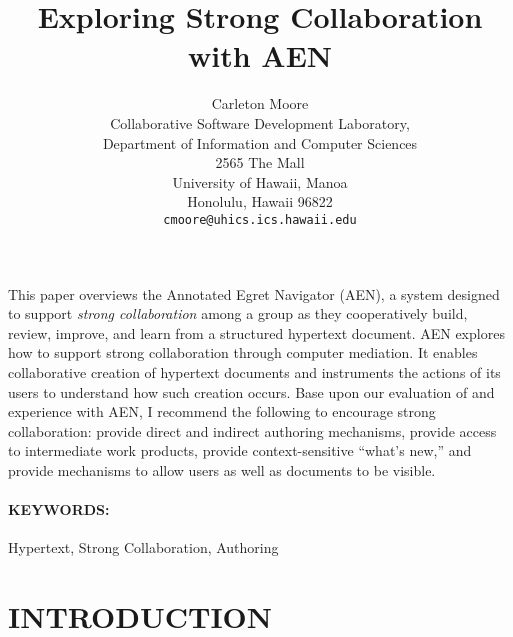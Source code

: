 




\title{Exploring Strong Collaboration with AEN}
\author{Carleton Moore\\
Collaborative Software Development Laboratory,\\
Department of Information and Computer Sciences\\
2565 The Mall\\
University of Hawaii, Manoa\\
Honolulu, Hawaii   96822\\
{\tt cmoore@uhics.ics.hawaii.edu}}
\maketitle
\abstract

This paper overviews the Annotated Egret Navigator (AEN), a system designed
to support {\em strong collaboration} among a group as they cooperatively
build, review, improve, and learn from a structured hypertext document.
AEN explores how to support strong collaboration through computer
mediation. It enables collaborative creation of hypertext documents and
instruments the actions of its users to understand how such creation
occurs.  Base upon our evaluation of and experience with AEN, I recommend
the following to encourage strong collaboration: provide direct and
indirect authoring mechanisms, provide access to intermediate work
products, provide context-sensitive ``what's new,'' and provide mechanisms
to allow users as well as documents to be visible.

\paragraph{KEYWORDS:} Hypertext, Strong Collaboration, Authoring

\section{INTRODUCTION}

